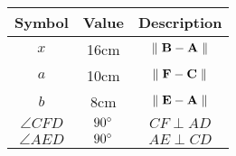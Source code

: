 \begin{tabular}{|c|c|c|}
\hline
Symbol & Value & Description\\
\hline
$x$ & 16cm & $\|\hspace{0.1cm} \vec{B} - \vec{A} \hspace{0.1cm}\|$ \\
\hline
$a$ & 10cm & $\|\hspace{0.1cm} \vec{F} - \vec{C} \hspace{0.1cm}\|$ \\
\hline
$b$ & 8cm & $\|\hspace{0.1cm} \vec{E} - \vec{A} \hspace{0.1cm}\|$ \\
\hline
$\angle{CFD}$ & $90\degree$ & $CF \perp AD$ \\
\hline
$\angle{AED}$ & $90\degree$ & $AE \perp CD$ \\
\hline
\end{tabular}
